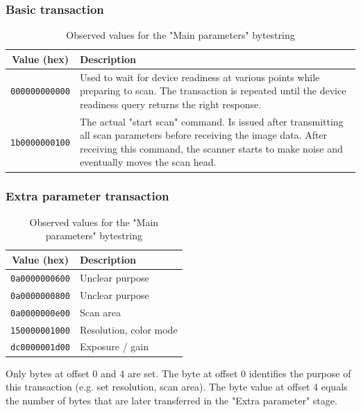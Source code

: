 \documentclass{article}
\begin{document}
\subsubsection{Basic transaction}
\label{appendix_basic}

\begin{table}[H]
  \caption{Observed values for the "Main parameters" bytestring}
  \centering
  \begin{tabular}{c | p{9cm}}
    Value (hex) & Description \\ \hline
    {\tt 000000000000} & Used to wait for device readiness at various points while preparing to scan. The transaction is repeated
                         until the device readiness query returns the right response.
                         \\
    {\tt 1b0000000100} & The actual "start scan" command. Is issued after transmitting all scan parameters
                         before receiving the image data. After receiving this command, the scanner
                         starts to make noise and eventually moves the scan head. \\
  \end{tabular}
\end{table}

\subsubsection{Extra parameter transaction}
\label{appendix_extra}

\begin{table}[H]
  \caption{Observed values for the "Main parameters" bytestring}
  \centering
  \begin{tabular}{c | p{7cm}}
    Value (hex) & Description \\ \hline
    {\tt 0a0000000600} & Unclear purpose \\
    {\tt 0a0000000800} & Unclear purpose \\
    {\tt 0a0000000e00} & Scan area \\
    {\tt 150000001000} & Resolution, color mode \\
    {\tt dc0000001d00} & Exposure / gain \\
  \end{tabular}
\end{table}

Only bytes at offset 0 and 4 are set. The byte at offset 0 identifies the
purpose of this transaction (e.g. set resolution, scan area). The byte value at offset 4 equals
the number of bytes that are later transferred in the "Extra parameter"
stage.
\end{document}

